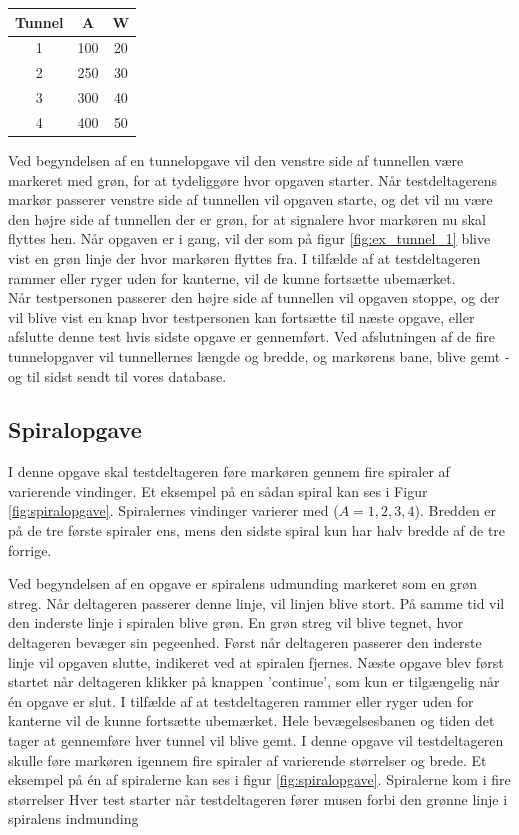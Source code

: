 \begin{center}
	\begin{tabular}{c c c}
		Tunnel & A & W \\
		\hline
		1 & 100 & 20 \\
		2 & 250 & 30 \\
		3 & 300 & 40 \\
		4 & 400 & 50 \\
	\end{tabular}
	\label{tab:tunnelopgave}
\end{center}
Ved begyndelsen af en tunnelopgave vil den venstre side af tunnellen være markeret med grøn, for at tydeliggøre hvor opgaven starter. Når testdeltagerens markør passerer venstre side af tunnellen vil opgaven starte, og det vil nu være den højre side af tunnellen der er grøn, for at signalere hvor markøren nu skal flyttes hen. Når opgaven er i gang, vil der som på figur \ref{fig:ex_tunnel_1} blive vist en grøn linje der hvor markøren flyttes fra. I tilfælde af at testdeltageren rammer eller ryger uden for kanterne, vil de kunne fortsætte ubemærket.\\
Når testpersonen passerer den højre side af tunnellen vil opgaven stoppe, og der vil blive vist en knap hvor testpersonen kan fortsætte til næste opgave, eller afslutte denne test hvis sidste opgave er gennemført. Ved afslutningen af de fire tunnelopgaver vil tunnellernes længde og bredde, og markørens bane, blive gemt - og til sidst sendt til vores database.

\subsection*{Spiralopgave}
I denne opgave skal testdeltageren føre markøren gennem fire spiraler af varierende vindinger. Et eksempel på en sådan spiral kan ses i Figur \ref{fig:spiralopgave}. Spiralernes vindinger varierer med ($A = 1, 2, 3, 4$). Bredden er på de tre første spiraler ens, mens den sidste spiral kun har halv bredde af de tre forrige.

Ved begyndelsen af en opgave er spiralens udmunding markeret som en grøn streg. Når deltageren passerer denne linje, vil linjen blive stort. På samme tid vil den inderste linje i spiralen blive grøn. En grøn streg vil blive tegnet, hvor deltageren bevæger sin pegeenhed. Først når deltageren passerer den inderste linje vil opgaven slutte, indikeret ved at spiralen fjernes. Næste opgave blev først startet når deltageren klikker på knappen 'continue', som kun er tilgængelig når én opgave er slut. I tilfælde af at testdeltageren rammer eller ryger uden for kanterne vil de kunne fortsætte ubemærket. Hele bevægelsesbanen og tiden det tager at gennemføre hver tunnel vil blive gemt.
I denne opgave vil testdeltageren skulle føre markøren igennem fire spiraler af varierende størrelser og brede. Et eksempel på én af spiralerne kan ses i figur \ref{fig:spiralopgave}. Spiralerne kom i fire størrelser Hver test starter når testdeltageren fører musen forbi den grønne linje i spiralens indmunding


